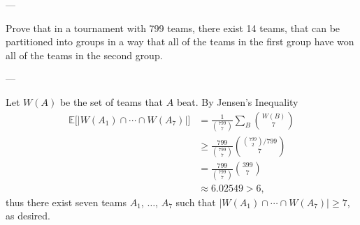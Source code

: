 
---

Prove that in a tournament with 799 teams, there exist 14 teams, that can be partitioned into groups in a way that all of the teams in the first group have won all of the teams in the second group.

---

Let $W(A)$ be the set of teams that $A$ beat. By Jensen's Inequality
\begin{align*}
    \mathbb E\Big[\big\lvert W(A_1)\cap\cdots\cap W(A_7)\big\rvert\Big]&=\frac1{\binom{799}7}\sum_B\binom{W(B)}7\\
    &\ge\frac{799}{\binom{799}7}\binom{\binom{799}2/799}7\\
    &=\frac{799}{\binom{799}7}\binom{399}7\\
    &\approx6.02549>6,
\end{align*}
thus there exist seven teams $A_1$, $\ldots$, $A_7$ such that $\big\lvert W(A_1)\cap\cdots\cap W(A_7)\big\rvert\ge7$, as desired.

